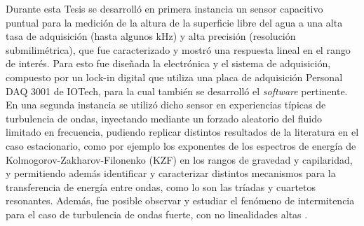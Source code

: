 \newenvironment{abstract}%
{\thispagestyle{empty} \cleardoublepage\null
\thispagestyle{empty} 
\vfill\begin{center}%
    \bfseries 
    \abstractname
\end{center}} 
{\thispagestyle{empty} \vfill\null }

\begin{abstract}
Durante esta Tesis se desarrolló en primera instancia un sensor capacitivo puntual para la medición de la altura de la superficie libre del agua a una alta tasa de adquisición (hasta algunos kHz) y alta precisión (resolución submilimétrica), que fue caracterizado y mostró una respuesta lineal en el rango de interés. Para esto fue diseñada la electrónica y el sistema de adquisición, compuesto por un lock-in digital que utiliza una placa de adquisición Personal DAQ 3001 de IOTech, para la cual también se desarrolló el \textit{software} pertinente. En una segunda instancia se utilizó dicho sensor en experiencias típicas de turbulencia de ondas, inyectando mediante un forzado aleatorio del fluido limitado en frecuencia, pudiendo replicar distintos resultados de la literatura en el caso estacionario, como por ejemplo los exponentes de los espectros de energía de Kolmogorov-Zakharov-Filonenko (KZF) en los rangos de gravedad y capilaridad,  y permitiendo además identificar y caracterizar distintos mecanismos para la transferencia de energía entre ondas, como lo son las tríadas y cuartetos resonantes. Además, fue posible observar y estudiar el fenómeno de intermitencia para el caso de turbulencia de ondas fuerte, con no linealidades altas . %

\end{abstract}

